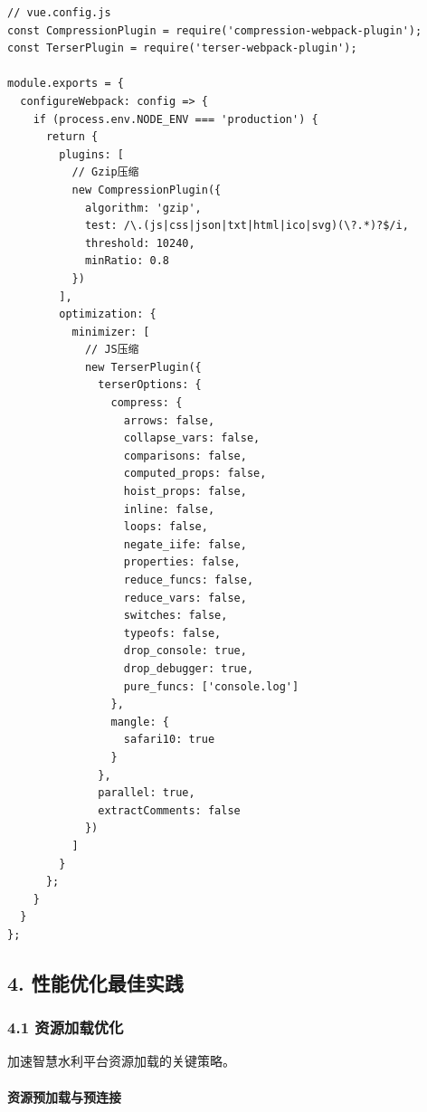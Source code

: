 \begin{lstlisting}
// vue.config.js
const CompressionPlugin = require('compression-webpack-plugin');
const TerserPlugin = require('terser-webpack-plugin');

module.exports = {
  configureWebpack: config => {
    if (process.env.NODE_ENV === 'production') {
      return {
        plugins: [
          // Gzip压缩
          new CompressionPlugin({
            algorithm: 'gzip',
            test: /\.(js|css|json|txt|html|ico|svg)(\?.*)?$/i,
            threshold: 10240,
            minRatio: 0.8
          })
        ],
        optimization: {
          minimizer: [
            // JS压缩
            new TerserPlugin({
              terserOptions: {
                compress: {
                  arrows: false,
                  collapse_vars: false,
                  comparisons: false,
                  computed_props: false,
                  hoist_props: false,
                  inline: false,
                  loops: false,
                  negate_iife: false,
                  properties: false,
                  reduce_funcs: false,
                  reduce_vars: false,
                  switches: false,
                  typeofs: false,
                  drop_console: true,
                  drop_debugger: true,
                  pure_funcs: ['console.log']
                },
                mangle: {
                  safari10: true
                }
              },
              parallel: true,
              extractComments: false
            })
          ]
        }
      };
    }
  }
};
\end{lstlisting}

\subsection{4.
性能优化最佳实践}\label{ux6027ux80fdux4f18ux5316ux6700ux4f73ux5b9eux8df5}

\subsubsection{4.1
资源加载优化}\label{ux8d44ux6e90ux52a0ux8f7dux4f18ux5316}

加速智慧水利平台资源加载的关键策略。

\paragraph{资源预加载与预连接}\label{ux8d44ux6e90ux9884ux52a0ux8f7dux4e0eux9884ux8fdeux63a5}

